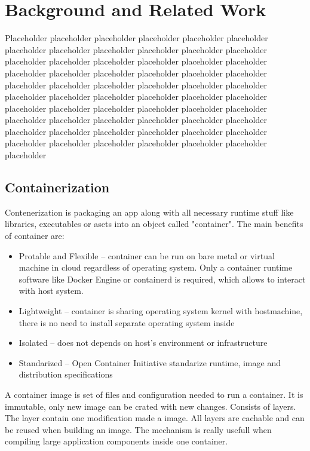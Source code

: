 \chapter{Background and Related Work}
\label{cha:background}

Placeholder placeholder placeholder placeholder placeholder placeholder placeholder placeholder placeholder placeholder placeholder placeholder placeholder placeholder placeholder placeholder placeholder placeholder placeholder placeholder placeholder placeholder placeholder placeholder placeholder placeholder placeholder placeholder placeholder placeholder placeholder placeholder placeholder placeholder placeholder placeholder placeholder placeholder placeholder placeholder placeholder placeholder placeholder placeholder placeholder placeholder placeholder placeholder placeholder placeholder placeholder placeholder placeholder placeholder placeholder placeholder placeholder placeholder placeholder placeholder placeholder



\section{Containerization}
\label{sec:containerization}

Contenerization is packaging an app along with all necessary runtime stuff like libraries, executables or asets into an object called "container". The main benefits of container are\cite{RedhatContainerization}:
\begin{itemize}
    \item Protable and Flexible -- container can be run on bare metal or virtual machine in cloud regardless of operating system. Only a container runtime software like Docker Engine or containerd is required, which allows to interact with host system.
    \item Lightweight -- container is sharing operating system kernel with hostmachine, there is no need to install separate operating system inside
    \item Isolated -- does not depends on host's environment or infrastructure
    \item Standarized -- Open Container Initiative standarize runtime, image and distribution specifications
\end{itemize}
A container image is set of files and configuration needed to run a container. It is immutable, only new image can be crated with new changes. Consists of layers. The layer contain one modification made a image. All layers are cachable and can be reused when building an image. The mechanism is really usefull when compiling large application components inside one container\cite{DockerImage}.

